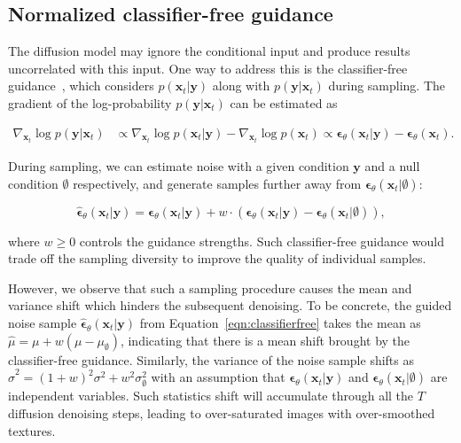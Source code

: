 \subsection{Normalized classifier-free guidance} The diffusion model may ignore the conditional input and produce results uncorrelated with this input. One way to address this is the classifier-free guidance~\cite{ho2021classifier}, which considers $p(\bm{x}_t|\bm{y})$ along with $p(\bm{y} | \bm{x}_t)$ during sampling. The gradient of the log-probability $p(\bm{y} | \bm{x}_t)$ can be estimated as

\begin{equation}
  \begin{aligned}
    \nabla_{\bm{x}_{t}} \log p \left(\bm{y} | \bm{x}_{t}\right) & \propto \nabla_{\bm{x}_{t}} \log p\left(\bm{x}_{t} | \bm{y}\right)-\nabla_{\bm{x}_{t}} \log p\left(\bm{x}_{t}\right)  \propto \bm{\epsilon}_{\theta}\left(\bm{x}_{t} | \bm{y}\right)-\bm{\epsilon}_{\theta}\left(\bm{x}_{t}\right).
  \end{aligned}
\end{equation}

During sampling, we can estimate noise with a given condition $\bm{y}$ and a null condition $\bm{\emptyset}$ respectively, and generate samples further away from $\bm{\epsilon}_{\theta}(\bm{x}_t|\bm{\emptyset})$:

\begin{equation}
  \hat{\bm{\epsilon}}_{\theta}\left(\bm{x}_{t} | \bm{y}\right)=\bm{\epsilon}_{\theta}\left(\bm{x}_{t} |  \bm{y}\right)+ w \cdot\left(\bm{\epsilon}_{\theta}\left(\bm{x}_{t} | \bm{y}\right)-\bm{\epsilon}_{\theta}\left(\bm{x}_{t} | \bm{\emptyset}\right)\right),
  \label{eqn:classifierfree}
\end{equation}

where $w \geq 0$ controls the guidance strengths. Such classifier-free guidance would trade off the sampling diversity to improve the quality of individual samples.

However, we observe that such a sampling procedure causes the mean and variance shift which hinders the subsequent denoising. To be concrete, the guided noise sample $\hat{\bm{\epsilon}}_{\theta}\left(\bm{x}_{t} | \bm{y}\right)$ from  Equation~\ref{eqn:classifierfree} takes the mean as $\hat{\mu} = \mu + w (\mu - \mu_{\emptyset})$, indicating that there is a mean shift brought by the classifier-free guidance. Similarly, the variance of the noise sample shifts as $\hat{\sigma}^2 = (1 + w)^2\sigma^2 + w^2\sigma_{\emptyset}^2$ with an assumption that $\bm{\epsilon}_{\theta}\left(\bm{x}_{t} |  \bm{y}\right)$ and $\bm{\epsilon}_{\theta}\left(\bm{x}_{t} | \bm{\emptyset}\right)$ are independent variables. Such statistics shift will accumulate through all the $T$ diffusion denoising steps, leading to over-saturated images with over-smoothed textures.

